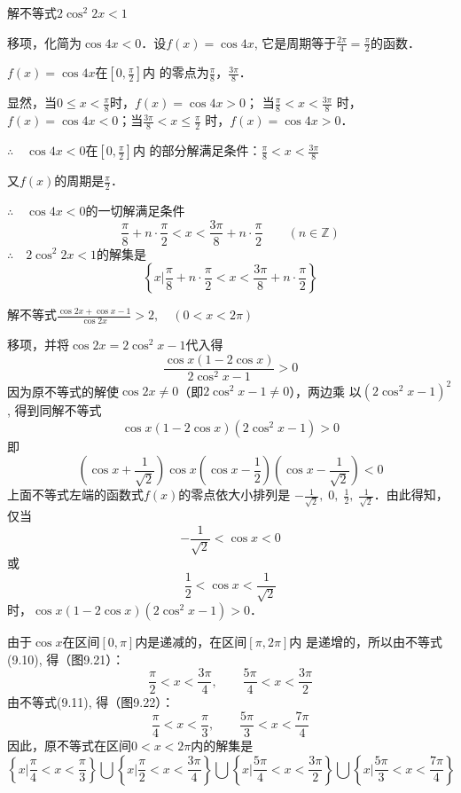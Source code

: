 \begin{example}
    解不等式$2\cos^2 2x<1$
\end{example}

\begin{solution}
移项，化简为$\cos4x<0$．设$f(x)=\cos4x$, 它是周期等于$\frac{2\pi}{4}=\frac{\pi}{2}$的函数．

$f(x)=\cos4x$在$\left[0,\frac{\pi}{2}\right]$内
的零点为$\frac{\pi}{8}$，$\frac{3\pi}{8}$．

显然，当$0\le x<\frac{\pi}{8}$时，$f(x)=\cos4x>0$；
当$\frac{\pi}{8}<x<\frac{3\pi}{8}$
时，$f(x)=\cos4x<0$；当$\frac{3\pi}{8}<x\le \frac{\pi}{2}$
时，$f(x)=\cos4x>0$．

$\therefore\quad \cos4x<0$在$\left[0,\frac{\pi}{2}\right]$内
的部分解满足条件：$\frac{\pi}{8}<x<\frac{3\pi}{8}$

又$f(x)$的周期是$\frac{\pi}{2}$．

$\therefore\quad \cos4x<0$的一切解满足条件
\[\frac{\pi}{8}+n\cdot\frac{\pi}{2}<x<\frac{3\pi}{8}+n\cdot\frac{\pi}{2}\qquad (n\in\mathbb{Z})\]
$\therefore\quad 2\cos^2 2x<1$的解集是
\[\left\{x\Big| \frac{\pi}{8}+n\cdot\frac{\pi}{2}<x<\frac{3\pi}{8}+n\cdot\frac{\pi}{2}\right\}\]
\end{solution}


\begin{example}
    解不等式$\frac{\cos2x+\cos x-1}{\cos2x}>2,\quad (0<x<2\pi)$
\end{example}

\begin{solution}
    移项，并将$\cos2x=2\cos^2x-1$代入得
   \[\frac{\cos x(1-2\cos x)}{2\cos^2x-1}>0\]
    因为原不等式的解使$\cos2x\ne 0$（即$2\cos^2x-1\ne 0$），两边乘
    以$(2\cos^2x-1)^2$, 得到同解不等式
 \[   \cos x(1-2\cos x)(2\cos^2x-1)>0\]
    即
\[\left(\cos x+\frac{1}{\sqrt{2}}\right)\cos x\left(\cos x-\frac{1}{2}\right)\left(\cos x-\frac{1}{\sqrt{2}}\right)<0\]
上面不等式左端的函数式$f(x)$的零点依大小排列是
$-\frac{1}{\sqrt{2}},\; 0,\; \frac{1}{2},\; \frac{1}{\sqrt{2}}$．由此得知，仅当
\begin{equation}
    -\frac{1}{\sqrt{2}}<\cos x<0
\end{equation}
或
\begin{equation}
    \frac{1}{2}<\cos x<\frac{1}{\sqrt{2}}
\end{equation}
时，$\cos x(1-2\cos x)(2\cos^2x-1)>0$．

由于$\cos x$在区间$[0,\pi]$内是递减的，在区间$[\pi,2\pi]$内
是递增的，所以由不等式(9.10), 得（图9.21）：
\[\frac{\pi}{2}<x<\frac{3\pi}{4},\qquad \frac{5\pi}{4}<x<\frac{3\pi}{2}\]
由不等式(9.11), 得（图9.22）：
\[\frac{\pi}{4}<x<\frac{\pi}{3},\qquad \frac{5\pi}{3}<x<\frac{7\pi}{4}\]
因此，原不等式在区间$0<x<2\pi$内的解集是
\[\left\{x\Big|\frac{\pi}{4}<x<\frac{\pi}{3} \right\}\bigcup\left\{x\Big|\frac{\pi}{2}<x<\frac{3\pi}{4} \right\}\bigcup\left\{x\Big|\frac{5\pi}{4}<x<\frac{3\pi}{2} \right\}\bigcup\left\{x\Big|\frac{5\pi}{3}<x<\frac{7\pi}{4} \right\}\]
\end{solution}

